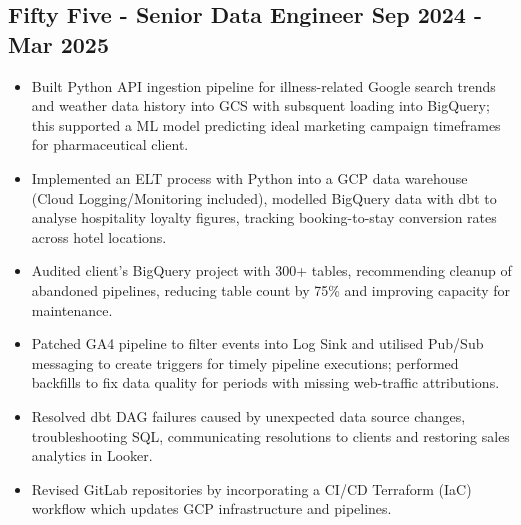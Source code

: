 \documentclass[a4paper, 10pt]{article}
\begin{document}
\subsection*{\textbf{Fifty Five - Senior Data Engineer} \hfill  Sep 2024 - Mar 2025}
\begin{itemize}[noitemsep]
    \item Built Python API ingestion pipeline for illness-related Google search trends and weather data history into GCS with subsquent loading into BigQuery; this supported a ML model predicting ideal marketing campaign timeframes for pharmaceutical client.
    \item Implemented an ELT process with Python into a GCP data warehouse (Cloud Logging/Monitoring included), modelled BigQuery data with dbt to analyse hospitality loyalty figures, tracking booking-to-stay conversion rates across hotel locations.
    \item Audited client's BigQuery project with 300+ tables, recommending cleanup of abandoned pipelines, reducing table count by 75\% and improving capacity for maintenance.
    \item Patched GA4 pipeline to filter events into Log Sink and utilised Pub/Sub messaging to create triggers for timely pipeline executions; performed backfills to fix data quality for periods with missing web-traffic attributions.
    \item Resolved dbt DAG failures caused by unexpected data source changes, troubleshooting SQL, communicating resolutions to clients and restoring sales analytics in Looker.
    \item Revised GitLab repositories by incorporating a CI/CD Terraform (IaC) workflow which updates GCP infrastructure and pipelines.
\end{itemize}
\end{document}

